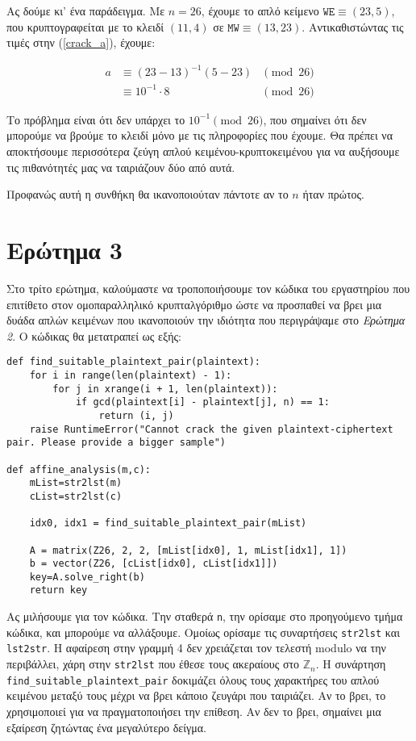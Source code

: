 \documentclass{article}
\begin{document}
Ας δούμε κι' ένα παράδειγμα. Με $n = 26$, έχουμε το απλό κείμενο $\texttt{WE} \equiv (23, 5)$, που κρυπτογραφείται με το κλειδί $(11, 4)$ σε $\texttt{MW} \equiv (13, 23)$. Αντικαθιστώντας τις τιμές στην (\ref{crack_a}), έχουμε:

\begin{align*}
a &\equiv (23 - 13)^{-1} (5 - 23) &\pmod{26} \\
  &\equiv 10^{-1} \cdot 8 &\pmod{26}
\end{align*}

Το πρόβλημα είναι ότι δεν υπάρχει το $10^{-1} \pmod{26}$, που σημαίνει ότι δεν μπορούμε να βρούμε το κλειδί μόνο με τις πληροφορίες που έχουμε. Θα πρέπει να αποκτήσουμε περισσότερα ζεύγη απλού κειμένου-κρυπτοκειμένου για να αυξήσουμε τις πιθανότητές μας να ταιριάζουν δύο από αυτά.

Προφανώς αυτή η συνθήκη θα ικανοποιούταν πάντοτε αν το $n$ ήταν πρώτος.

\section*{Ερώτημα 3}

Στο τρίτο ερώτημα, καλούμαστε να τροποποιήσουμε τον κώδικα του εργαστηρίου που επιτίθετο στον ομοπαραλληλικό κρυπταλγόριθμο ώστε να προσπαθεί να βρει μια δυάδα απλών κειμένων που ικανοποιούν την ιδιότητα που περιγράψαμε στο \emph{Ερώτημα 2}. Ο κώδικας θα μετατραπεί ως εξής:

\begin{lstlisting}
def find_suitable_plaintext_pair(plaintext):
    for i in range(len(plaintext) - 1):
        for j in xrange(i + 1, len(plaintext)):
            if gcd(plaintext[i] - plaintext[j], n) == 1:
                return (i, j)
    raise RuntimeError("Cannot crack the given plaintext-ciphertext pair. Please provide a bigger sample")

def affine_analysis(m,c):
    mList=str2lst(m)
    cList=str2lst(c)

    idx0, idx1 = find_suitable_plaintext_pair(mList)

    A = matrix(Z26, 2, 2, [mList[idx0], 1, mList[idx1], 1])
    b = vector(Z26, [cList[idx0], cList[idx1]])
    key=A.solve_right(b)
    return key
\end{lstlisting}

Ας μιλήσουμε για τον κώδικα. Την σταθερά \lstinline|n|, την ορίσαμε στο προηγούμενο τμήμα κώδικα, και μπορούμε να αλλάξουμε. Ομοίως ορίσαμε τις συναρτήσεις \lstinline|str2lst| και \lstinline|lst2str|. Η αφαίρεση στην γραμμή 4 δεν χρειάζεται τον τελεστή modulo να την περιβάλλει, χάρη στην \lstinline|str2lst| που έθεσε τους ακεραίους στο $\mathbb{Z}_n$. Η συνάρτηση \lstinline|find_suitable_plaintext_pair| δοκιμάζει όλους τους χαρακτήρες του απλού κειμένου μεταξύ τους μέχρι να βρει κάποιο ζευγάρι που ταιριάζει. Αν το βρει, το χρησιμοποιεί για να πραγματοποιήσει την επίθεση. Αν δεν το βρει, σημαίνει μια εξαίρεση ζητώντας ένα μεγαλύτερο δείγμα.
\end{document}
